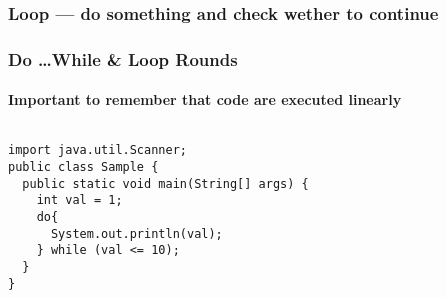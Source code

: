 \documentclass[en, 11pt, xcolor=dvipsnames]{beamer}
\begin{document}
\subsubsection{Loop --- do something and check wether to continue}
\begin{frame}[fragile]
	\frametitle{Do \dots While \& Loop Rounds}
	\framesubtitle{Important to remember that code are executed linearly}



	\begin{columns}[c]
		\begin{column}{0.9\textwidth}

			\begin{lstlisting}[style=Java]
import java.util.Scanner;
public class Sample {
  public static void main(String[] args) {
    int val = 1;
    do{
      System.out.println(val);
    } while (val <= 10);
  }
}\end{lstlisting}

		\end{column}
	\end{columns}

\end{frame}
\end{document}
